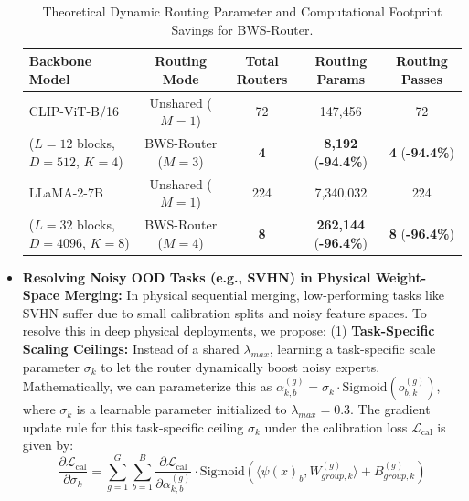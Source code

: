 \begin{itemize}
    \begin{table}[h]
    \centering
    \caption{Theoretical Dynamic Routing Parameter and Computational Footprint Savings for BWS-Router.}
    \label{tab:scaling_savings}
    \footnotesize
    \begin{tabular}{lcccc}
    \toprule
    \textbf{Backbone Model} & \textbf{Routing Mode} & \textbf{Total Routers} & \textbf{Routing Params} & \textbf{Routing Passes} \\ \midrule
    CLIP-ViT-B/16 & Unshared ($M=1$) & 72 & 147,456 & 72 \\
    ($L=12$ blocks, $D=512$, $K=4$) & BWS-Router ($M=3$) & \textbf{4} & \textbf{8,192} (\textbf{-94.4\%}) & \textbf{4} (\textbf{-94.4\%}) \\ \midrule
    LLaMA-2-7B & Unshared ($M=1$) & 224 & 7,340,032 & 224 \\
    ($L=32$ blocks, $D=4096$, $K=8$) & BWS-Router ($M=4$) & \textbf{8} & \textbf{262,144} (\textbf{-96.4\%}) & \textbf{8} (\textbf{-96.4\%}) \\ \bottomrule
    \end{tabular}
    \end{table}
    \item \textbf{Resolving Noisy OOD Tasks (e.g., SVHN) in Physical Weight-Space Merging:} In physical sequential merging, low-performing tasks like SVHN suffer due to small calibration splits and noisy feature spaces. To resolve this in deep physical deployments, we propose: (1) \textbf{Task-Specific Scaling Ceilings:} Instead of a shared $\lambda_{max}$, learning a task-specific scale parameter $\sigma_k$ to let the router dynamically boost noisy experts. Mathematically, we can parameterize this as $\alpha_{k, b}^{(g)} = \sigma_k \cdot \text{Sigmoid}(o^{(g)}_{b, k})$, where $\sigma_k$ is a learnable parameter initialized to $\lambda_{max} = 0.3$. The gradient update rule for this task-specific ceiling $\sigma_k$ under the calibration loss $\mathcal{L}_{\text{cal}}$ is given by:
    \begin{equation}
        \frac{\partial \mathcal{L}_{\text{cal}}}{\partial \sigma_k} = \sum_{g=1}^G \sum_{b=1}^B \frac{\partial \mathcal{L}_{\text{cal}}}{\partial \alpha_{k, b}^{(g)}} \cdot \text{Sigmoid}\left( \langle \psi(x)_b, W_{group, k}^{(g)} \rangle + B_{group, k}^{(g)} \right)
    \end{equation}

\end{itemize}
